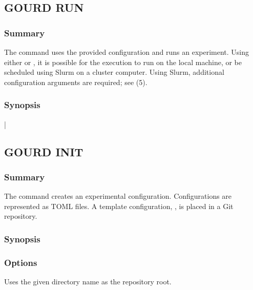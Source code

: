 \documentclass[a4paper,english]{article}
\begin{document}
        \subsection{GOURD RUN}

            \subsubsection{Summary}
                The   command uses the provided configuration and
                runs an experiment.
                Using either  or , it is possible for the execution
                to run on the local machine, or be scheduled using Slurm on a cluster computer.
                Using Slurm, additional configuration arguments are required; see (5).

            \subsubsection{Synopsis}
                  |    

        \subsection{GOURD INIT}

            \subsubsection{Summary}
                The   command creates an experimental configuration.
                Configurations are represented as TOML files.
                A template configuration, , is placed in a Git repository.

            \subsubsection{Synopsis}
                      

            \subsubsection{Options}
                \begin{Description}[Options]
                \item[\OptArg{-D}{ directory}]
                Uses the given directory name as the repository root.
                \end{Description}
\end{document}
